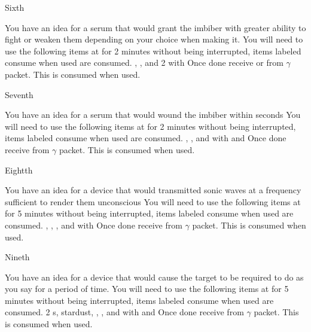\documentclass[greennotebook]{guildcamp3} %
\begin{document}
\begin{page}{Sixth}
	
	You have an idea for a serum that would grant the imbiber with greater ability to fight or weaken them depending on your choice when making it.
	You will need to use the following items at \sSciWorkbench{} for 2 minutes without being interrupted, items labeled consume when used are consumed.
	\iCompoundNine{}, \iUnicornHoof{}, and 2 \iScrapMetal{} with \iMultitool{}
	Once done receive \iCRUpSerum{} or \iCRDownSerum{} from $\gamma$ packet. This is consumed when used. 
	
\end{page}

\begin{page}{Seventh}
	
	You have an idea for a serum that would wound the imbiber within seconds
	You will need to use the following items at \sSciWorkbench{} for 2 minutes without being interrupted, items labeled consume when used are consumed.
	\iCompoundNine{}, \iBloodPlasma{}, and \iBelladonna{} with \iCentrifuge{} and \iTestTube{}
	Once done receive \iTechPoison{} from $\gamma$ packet. This is consumed when used. 
	
\end{page}

\begin{page}{Eightth}
	
	You have an idea for a device that would transmitted sonic waves at a frequency sufficient to render them unconscious
	You will need to use the following items at \sSciWorkbench{} for 5 minutes without being interrupted, items labeled consume when used are consumed.
	\iCompoundNine{}, \iOil{}, \iWerewolfFang{}, \iGraphiteLube{} and \iBelladonna{} with \iLeadPipe{}
	Once done receive \iSonicKO{} from $\gamma$ packet. This is consumed when used. 
	
\end{page}

\begin{page}{Nineth}
	
	You have an idea for a device that would cause the target to be required to do as you say for a period of time.
	You will need to use the following items at \sSciWorkbench{} for 5 minutes without being interrupted, items labeled consume when used are consumed.
	2 \iTransistor{}s, stardust, \iCircuitBoard{}, \iCog{}, and \iGraphiteLube{} with \iDiamondDrill{} and \iMonoBlade{}
	Once done receive \iMCDevice{} from $\gamma$ packet. This is consumed when used. 
	
\end{page}
\end{document}
